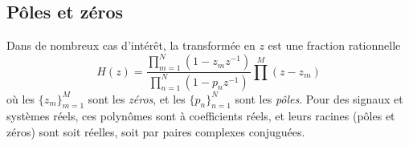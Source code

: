 %
%
%
%
%
%
\subsection{Pôles et zéros}
Dans de nombreux cas d'intérêt, la transformée en $z$ est une fraction rationnelle
\begin{equation}
\label{eq:transformee-z-generale}
H(z)= \frac{\prod_{m=1}^N (1 -z_m z^{-1})}{\prod_{n=1}^N (1 - p_n z^{-1})}
\prod^{M}(z-z_{m})
\end{equation}
o\`{u} les $\{ z_{m} \}_{m=1}^M$ sont les \emph{z\'{e}ros}, et les $\{ p_{n} \}_{n=1}^N$ sont les \emph{p\^{o}les}. 
Pour des signaux et systèmes r\'{e}els, ces polyn\^{o}mes sont \`{a} coefficients r\'{e}els, et leurs racines (p\^{o}les et z\'{e}ros) sont soit r\'{e}elles, soit par paires complexes conjugu\'{e}es. 

